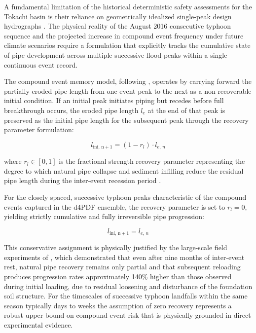 A fundamental limitation of the historical deterministic safety assessments for the Tokachi basin is their reliance on geometrically idealized single-peak design hydrographs \parencite{oyo_1999}. The physical reality of the August 2016 consecutive typhoon sequence and the projected increase in compound event frequency under future climate scenarios \parencite{yamada_iahr_2020, hoshino2023spatiotemporal} require a formulation that explicitly tracks the cumulative state of pipe development across multiple successive flood peaks within a single continuous event record.

The compound event memory model, following \textcite{pol_sie_2024}, operates by carrying forward the partially eroded pipe length from one event peak to the next as a non-recoverable initial condition. If an initial peak initiates piping but recedes before full breakthrough occurs, the eroded pipe length $l_e$ at the end of that peak is preserved as the initial pipe length for the subsequent peak through the recovery parameter formulation:

$$l_\mathrm{ini,\,n+1} = (1 - r_l) \cdot l_{e,\,n}$$

where $r_l \in [0,1]$ is the fractional strength recovery parameter representing the degree to which natural pipe collapse and sediment infilling reduce the residual pipe length during the inter-event recession period \parencite{pol_compgeo_2024}.

For the closely spaced, successive typhoon peaks characteristic of the compound events captured in the d4PDF ensemble, the recovery parameter is set to $r_l = 0$, yielding strictly cumulative and fully irreversible pipe progression:

$$l_\mathrm{ini,\,n+1} = l_{e,\,n}$$

This conservative assignment is physically justified by the large-scale field experiments of \textcite{pol_thesis_2022}, which demonstrated that even after nine months of inter-event rest, natural pipe recovery remains only partial and that subsequent reloading produces progression rates approximately 140\% higher than those observed during initial loading, due to residual loosening and disturbance of the foundation soil structure. For the timescales of successive typhoon landfalls within the same season typically days to weeks the assumption of zero recovery represents a robust upper bound on compound event risk that is physically grounded in direct experimental evidence.

